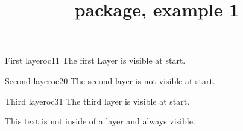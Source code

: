 \documentclass[a4paper]{ltxdoc}
\title{\pkg{OCG-P} package, example 1}
\begin{document}
\maketitle

\begin{ocg}{First layer}{oc1}{1}
  The first Layer is visible at start.
\end{ocg}

\begin{ocg}{Second layer}{oc2}{0}
  The second layer is not visible at start.
\end{ocg}

\begin{ocg}{Third layer}{oc3}{1}
 The third layer is visible at start.
\end{ocg}

This text is not inside of a layer and always visible.
\end{document}
